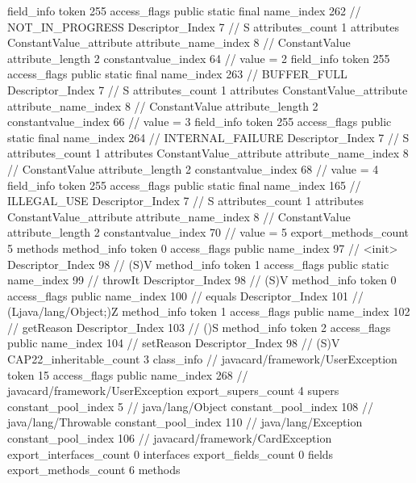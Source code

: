 {{{{{			}
			field_info {
				token	255
				access_flags	public static final
				name_index	262		// NOT_IN_PROGRESS
				Descriptor_Index	7		// S
				attributes_count	1
				attributes {
				ConstantValue_attribute {
					attribute_name_index	8		// ConstantValue
					attribute_length	2
					constantvalue_index	64		// value = 2
				}
				}
			}
			field_info {
				token	255
				access_flags	public static final
				name_index	263		// BUFFER_FULL
				Descriptor_Index	7		// S
				attributes_count	1
				attributes {
				ConstantValue_attribute {
					attribute_name_index	8		// ConstantValue
					attribute_length	2
					constantvalue_index	66		// value = 3
				}
				}
			}
			field_info {
				token	255
				access_flags	public static final
				name_index	264		// INTERNAL_FAILURE
				Descriptor_Index	7		// S
				attributes_count	1
				attributes {
				ConstantValue_attribute {
					attribute_name_index	8		// ConstantValue
					attribute_length	2
					constantvalue_index	68		// value = 4
				}
				}
			}
			field_info {
				token	255
				access_flags	public static final
				name_index	165		// ILLEGAL_USE
				Descriptor_Index	7		// S
				attributes_count	1
				attributes {
				ConstantValue_attribute {
					attribute_name_index	8		// ConstantValue
					attribute_length	2
					constantvalue_index	70		// value = 5
				}
				}
			}
			}
			export_methods_count	5
			methods {
				method_info {
					token	0
					access_flags	public
					name_index	97		// <init>
					Descriptor_Index	98		// (S)V
				}
				method_info {
					token	1
					access_flags	public static
					name_index	99		// throwIt
					Descriptor_Index	98		// (S)V
				}
				method_info {
					token	0
					access_flags	public
					name_index	100		// equals
					Descriptor_Index	101		// (Ljava/lang/Object;)Z
				}
				method_info {
					token	1
					access_flags	public
					name_index	102		// getReason
					Descriptor_Index	103		// ()S
				}
				method_info {
					token	2
					access_flags	public
					name_index	104		// setReason
					Descriptor_Index	98		// (S)V
				}
			}
			CAP22_inheritable_count	3
		}
		class_info {		// javacard/framework/UserException
			token	15
			access_flags	public
			name_index	268		// javacard/framework/UserException
			export_supers_count	4
			supers {
				constant_pool_index	5		// java/lang/Object
				constant_pool_index	108		// java/lang/Throwable
				constant_pool_index	110		// java/lang/Exception
				constant_pool_index	106		// javacard/framework/CardException
			}
			export_interfaces_count	0
			interfaces {
			}
			export_fields_count	0
			fields {
			}
			export_methods_count	6
			methods {
}}}}
